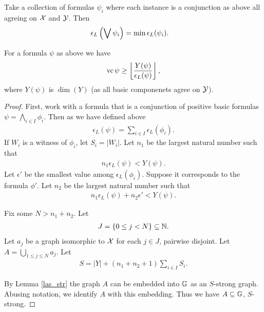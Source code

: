 \documentclass{amsart}
\begin{document}
\begin{Definition} [Disjunction]
  Take a collection of formulas $\psi_i$ where each instance is a conjunction as above all agreing on $\mathcal X$ and $\mathcal Y$.
  Then
  \begin{align*}
    \epsilon_L\left(\bigvee \psi_i\right) &= \min \epsilon_L(\psi_i).
  \end{align*}
\end{Definition}
\begin{Theorem} \label{main_lower}
  For a formula $\psi$ as above we have
  \begin{align*}
    \operatorname{vc} \psi \geq \left \lfloor \frac{Y(\psi)}{\epsilon_L(\psi)} \right \rfloor,
  \end{align*}
  where $Y(\psi)$ is $\dim(Y)$ (as all basic componenets agree on $\mathcal Y$).
\end{Theorem}
\begin{proof}
  First, work with a formula that is a conjunction of positive basic formulas $\psi = \bigwedge_{i \in I} \phi_i$.
  Then as we have defined above
  \begin{align*}
    \epsilon_L(\psi) = \sum_{i \in I} \epsilon_L(\phi_i).
  \end{align*}
  If $W_i$ is a witness of $\phi_i$, let $S_i = |W_i|$.
  Let $n_1$ be the largest natural number such that
  \begin{align*}
    n_1 \epsilon_L(\psi) < Y(\psi).
  \end{align*}
  Let $\epsilon'$ be the smallest value among $\epsilon_L(\phi_i)$.
  Suppose it corresponds to the formula $\phi'$.
  Let $n_2$ be the largest natural number such that
  \begin{align*}
    n_1 \epsilon_L(\psi) + n_2 \epsilon' < Y(\psi).
  \end{align*}

  Fix some $N > n_1 + n_2$.
  Let 
  \begin{align*}
    J = \left\{0 \leq j < N\right\} \subseteq \mathbb{N}.
  \end{align*}
  Let $a_j$ be a graph isomorphic to $\mathcal X$ for each $j \in J$, pairwise disjoint.
  Let $A = \bigcup_{1 \leq j \leq N} a_j$.
  Let 
  \begin{align*}
    S = |Y| + (n_1 + n_2 + 1) \sum_{i \in I} S_i.
  \end{align*}

  By Lemma \ref{las_str} the graph $A$ can be embedded into $\mathbb G$ as an $S$-strong graph. 
  Abusing notation, we identify $A$ with this embedding.
  Thus we have $A \subseteq \mathbb G$, $S$-strong. 


\end{proof}
\end{document}
